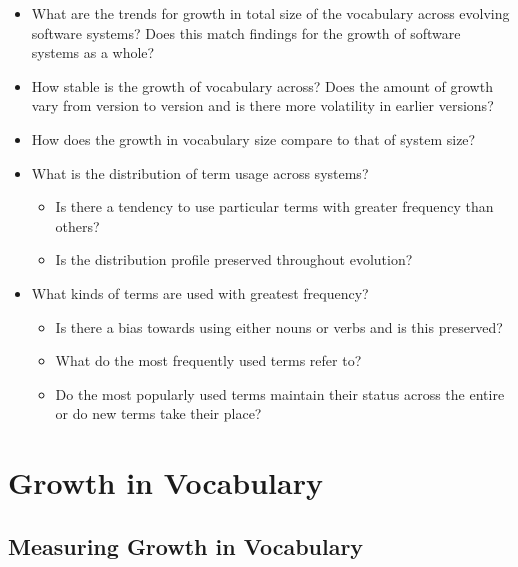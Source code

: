 \begin{itemize}
	\item What are the trends for growth in total size of the vocabulary across evolving software systems? Does this match findings for the growth of software systems as a whole?
	\item How stable is the growth of vocabulary across? Does the amount of growth vary from version to version and is there more volatility in earlier versions?
	\item How does the growth in vocabulary size compare to that of system size?
	
	\item What is the distribution of term usage across systems?
		\begin{itemize}
			\item Is there a tendency to use particular terms with greater frequency than others? 
			\item Is the distribution profile preserved throughout evolution?
		\end{itemize}
	
	\item What kinds of terms are used with greatest frequency?
		\begin{itemize}
			\item Is there a bias towards using either nouns or verbs and is this preserved?
			\item What do the most frequently used terms refer to?
			\item Do the most popularly used terms maintain their status across the entire or do new terms take their place?
		\end{itemize}
\end{itemize}


\section{Growth in Vocabulary} %
\label{sec:growth_in_vocabulary}

\subsection{Measuring Growth in Vocabulary} %
\label{sub:measuring_growth_in_vocabulary}

